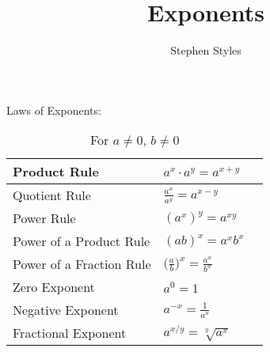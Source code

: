 \documentclass[16pt]{article}
\title{Exponents}
\author{Stephen Styles}
\theoremstyle{remark}
\begin{document}
\maketitle

Laws of Exponents:

\begin{table}[h!]
\centering
\caption{For $a\not= 0$, $b \not= 0$}
\begin{tabular}{||>{\centering\arraybackslash}m{1.5in} | M{1.5in}|| N } 
 \hline
 Product Rule & $\displaystyle{a^x \cdot a^y = a^{x+y}}$ &\\
 \hline
 Quotient Rule & $\displaystyle{\frac{a^x}{a^y}=a^{x-y}}$&\\
 \hline
 Power Rule & $\displaystyle{(a^x)^y = a^{xy}}$\\
 \hline
 Power of a Product Rule & $\displaystyle{(ab)^x = a^x b^x}$&\\ 
 \hline
 Power of a Fraction Rule & $\displaystyle{\bigg(\frac{a}{b}\bigg)^x = \frac{a^x}{b^x}}$&\\
 \hline
 Zero Exponent &$\displaystyle{a^0 = 1}$&\\
 \hline
 Negative Exponent & $\displaystyle{a^{-x} = \frac{1}{a^x}}$ &\\
 \hline
 Fractional Exponent & $\displaystyle{a^{x/y} = \sqrt[y]{a^x}}$&\\
 \hline
\end{tabular}
\end{table}
\end{document}
